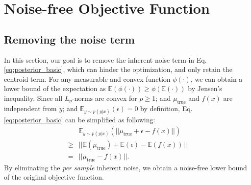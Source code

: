 \documentclass[letterpaper]{article} %
\begin{document}
\section{Noise-free Objective Function}
\label{sec:noise_free}

\subsection{Removing the noise term}

In this section, our goal is to remove the inherent noise term in Eq.\eqref{eq:posterior_basic}, which can hinder the optimization, and only retain the centroid term.
%
%
For any measurable and convex function $\phi(\cdot)$, we can obtain a lower bound of the expectation as $\mathbb{E}(\phi(\cdot)) \geq \phi(\mathbb{E(\cdot)})$ by Jensen's inequality. Since all $L_p\text{-norms}$ are convex for $p\geq1$; and $\mu_{\text{true}}$ and $f(x)$ are independent from $y$; and $\mathbb{E}_{y \sim p(y|x)}(\epsilon) = 0$ by definition, Eq.\eqref{eq:posterior_basic} can be simplified as following:
\begin{equation}
    \label{eq:lowerbound_true}
    \begin{aligned}
        & \mathbb{E}_{y \sim p(y|x)}(||\mu_{\text{true}} + \epsilon -f(x)||)
        \\
        \geq & ||\mathbb{E}(\mu_{\text{true}}) + \mathbb{E}(\epsilon) - \mathbb{E}(f(x))||
        \\
        = & ||\mu_{\text{true}} - f(x)||.
    \end{aligned}
\end{equation}
By eliminating the \textit{per sample} inherent noise, we obtain a noise-free lower bound of the original objective function.


%
%
\end{document}

